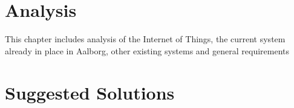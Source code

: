 
\usepackage[draft]{fixme}				%
\usepackage[disable]{todonotes}					%
\newcommand{\bycykel}{Aalborg Bycykel }

	
	\newpage\null\thispagestyle{empty}\newpage
	
	\addtocounter{page}{4}
	\newpage\null\thispagestyle{empty}\newpage
	
	\newpage\null\thispagestyle{empty}\newpage
	
	\label{startoftoc}
	\begin{KeepFromToc}
		\tableofcontents
		\newpage\null\thispagestyle{empty}\newpage
		\newpage\null\thispagestyle{empty}\newpage
		\todototoc
		\listoftodos
	\end{KeepFromToc}
	\label{endoftoc}
	
	
	\chapter{Analysis}
	This chapter includes analysis of the Internet of Things, the current system already in place in Aalborg, other existing systems and general requirements
	
	
	
	
	
	
	\chapter{Suggested Solutions}
	
	
	
	\afterpage{\thispagestyle{empty}}

	
	
	\label{lastpagewithoutappendix}

	\appendix
	
	\cleardoublepage

